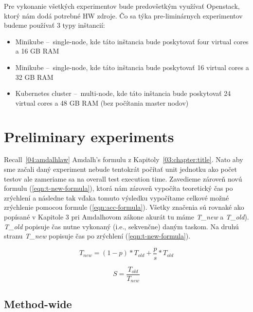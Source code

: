 Pre vykonanie všetkých experimentov bude predovšetkým využívať Openstack, ktorý nám dodá potrebné HW zdroje.
Čo sa týka pre-liminárnych experimentov budeme používať 3 typy inštancií:
\begin{itemize}
    \item Minikube \---\ single-node, kde táto inštancia bude poskytovať four virtual cores a 16 GB RAM
    \item Minikube \---\ single-node, kde táto inštancia bude poskytovať 16 virtual cores a 32 GB RAM
    \item Kubernetes cluster \---\ multi-node, kde táto inštancia bude poskytovať 24 virtual cores a 48 GB RAM (bez počítania master nodov)
\end{itemize}

\section{Preliminary experiments}

Recall~\ref{04:amdalhlaw} Amdalh's formulu z Kapitoly~\ref{03:chapter:title}.
Nato aby sme začali daný experiment nebude tentokrát počítať unit
jednotku ako počet testov ale zameriame sa na overall test execution time. Zavedieme zároveň novú formulu
(\eqref{eqn:t-new-formula}), ktorá nám zároveň vypočíta teoretický čas po zrýchlení a následne tak vďaka tomuto
výsledku vypočítame celkové možné zrýchlenie pomocou formule (\eqref{eqn:acc-formula}). Všetky značenia sú rovnaké
ako popísané v Kapitole 3 pri Amdalhovom zákone akurát tu máme \emph{T\_{new}} a \emph{T\_{old}}). \emph{T\_{old}} popisuje čas nutne vykonaný
(i.e., sekvenčne) daným taskom. Na druhú stranu \emph{T\_{new}} popisuje čas po zrýchlení (\eqref{eqn:t-new-formula}).

\begin{equation}
    \label{eqn:t-new-formula}
    T_{new} = (1 - p) * T_{old} +  \frac{p}{s} * T_{old}
    \tag{4}
\end{equation}

\begin{equation}
    \label{eqn:acc-formula}
    S = \frac{T_{old}}{T_{new}}
    \tag{5}
\end{equation}

\subsection{Method-wide}

